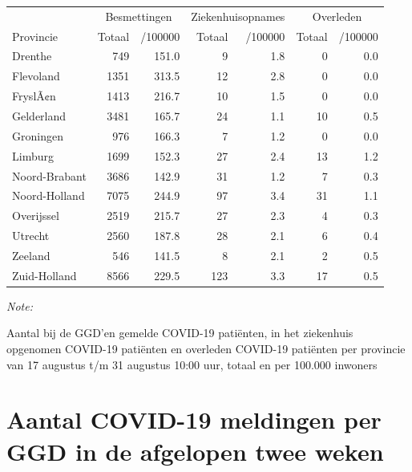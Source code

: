 \documentclass[
  english,
  man,floatsintext]{apa6}
\begin{document}
\begin{table}
\centering
\begin{threeparttable}
\begin{tabular}{lrrrrrr}
\toprule
\multicolumn{1}{c}{ } & \multicolumn{2}{c}{Besmettingen} & \multicolumn{2}{c}{Ziekenhuisopnames} & \multicolumn{2}{c}{Overleden} \\
\cmidrule(l{3pt}r{3pt}){2-3} \cmidrule(l{3pt}r{3pt}){4-5} \cmidrule(l{3pt}r{3pt}){6-7}
Provincie & Totaal & /100000 & Totaal & /100000 & Totaal & /100000\\
\midrule
Drenthe & 749 & 151.0 & 9 & 1.8 & 0 & 0.0\\
Flevoland & 1351 & 313.5 & 12 & 2.8 & 0 & 0.0\\
FryslÃ¢n & 1413 & 216.7 & 10 & 1.5 & 0 & 0.0\\
Gelderland & 3481 & 165.7 & 24 & 1.1 & 10 & 0.5\\
Groningen & 976 & 166.3 & 7 & 1.2 & 0 & 0.0\\
Limburg & 1699 & 152.3 & 27 & 2.4 & 13 & 1.2\\
Noord-Brabant & 3686 & 142.9 & 31 & 1.2 & 7 & 0.3\\
Noord-Holland & 7075 & 244.9 & 97 & 3.4 & 31 & 1.1\\
Overijssel & 2519 & 215.7 & 27 & 2.3 & 4 & 0.3\\
Utrecht & 2560 & 187.8 & 28 & 2.1 & 6 & 0.4\\
Zeeland & 546 & 141.5 & 8 & 2.1 & 2 & 0.5\\
Zuid-Holland & 8566 & 229.5 & 123 & 3.3 & 17 & 0.5\\
\bottomrule
\end{tabular}
\begin{tablenotes}
\item \textit{Note: } 
\item Aantal bij de GGD’en gemelde COVID-19 patiënten, in het ziekenhuis opgenomen COVID-19 patiënten en overleden COVID-19 patiënten per provincie van 17 augustus t/m 31 augustus 10:00 uur, totaal en per 100.000 inwoners
\end{tablenotes}
\end{threeparttable}
\end{table}

\newpage

\hypertarget{aantal-covid-19-meldingen-per-ggd-in-de-afgelopen-twee-weken}{%
\section{Aantal COVID-19 meldingen per GGD in de afgelopen twee weken}\label{aantal-covid-19-meldingen-per-ggd-in-de-afgelopen-twee-weken}}
\end{document}
